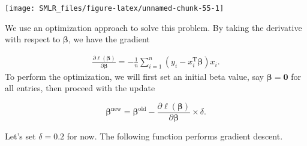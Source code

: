 \documentclass[
]{book}
\theoremstyle{definition}
\theoremstyle{definition}
\theoremstyle{definition}
\theoremstyle{definition}
\theoremstyle{remark}
\begin{document}
\begin{center}\texttt{[image: SMLR\_files/figure-latex/unnamed-chunk-55-1]} \end{center}

We use an optimization approach to solve this problem. By taking the derivative with respect to \(\boldsymbol \beta\), we have the gradient

\[
\begin{align}
\frac{\partial \ell(\boldsymbol \beta)}{\partial \boldsymbol \beta} = -\frac{1}{n} \sum_{i=1}^n (y_i - x_i^\text{T} \boldsymbol \beta) x_i.
\end{align}
\]
To perform the optimization, we will first set an initial beta value, say \(\boldsymbol \beta = \mathbf{0}\) for all entries, then proceed with the update

\[ \boldsymbol \beta^\text{new} = \boldsymbol \beta^\text{old} - \frac{\partial \ell(\boldsymbol \beta)}{\partial \boldsymbol \beta} \times \delta.\]

Let's set \(\delta = 0.2\) for now. The following function performs gradient descent.
\end{document}
